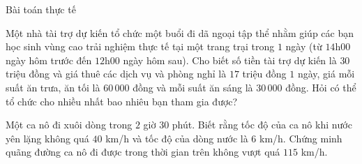 \begin{dang}{Bài toán thực tế}
\end{dang}
\begin{vd}
	Một nhà tài trợ dự kiến tổ chức một buổi đi dã ngoại tập thể nhằm giúp các bạn học sinh vùng cao trải nghiệm thực tế tại một trang trại trong $1$ ngày (từ $14$h$00$ ngày hôm trước đến $12$h$00$ ngày hôm sau). Cho biết số tiền tài trợ dự kiến là $30$ triệu đồng và giá thuê các dịch vụ và phòng nghỉ là $17$ triệu đồng $1$ ngày, giá mỗi suất ăn trưa, ăn tối là $60\,000$ đồng và mỗi suất ăn sáng là $30\,000$ đồng. Hỏi có thể tổ chức cho nhiều nhất bao nhiêu bạn tham gia được?
\end{vd}
\begin{vd}
	Một ca nô đi xuôi dòng trong $2$ giờ $30$ phút. Biết rằng tốc độ của ca nô khi nước yên lặng không quá $40$ km/h và tốc độ của dòng nước là $6$ km/h. Chứng minh quãng đường ca nô đi được trong thời gian trên không vượt quá $115$ km/h.
\end{vd}
